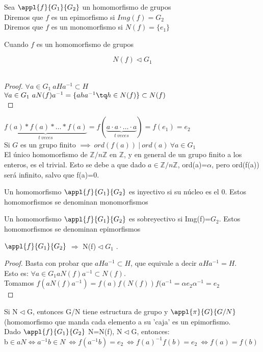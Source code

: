 \documentclass[a4paper,10pt]{apuntes}
\begin{document}
\begin{defn}
Sea $\appl{f}{G_1}{G_2}$ un homomorfismo de grupos\\
Diremos que $f$ es un epimorfismo si $Img(f) = G_2$\\
Diremos que $f$ es un monomorfismo si $N(f) = \{ e_1\} $
\end{defn}

\begin{lemma} Cuando $f$ es un homomorfismo de grupos

$$N(f) \lhd G_1$$\\
\end{lemma}

\begin{proof}
$\forall a\in G_1\ aHa^{-1}\subset H$\\
$\forall a\in G_1\ aN(f)a^{-1} = \{aha^{-1} \tq h\in N(f) \}\subset N(f)$\\
\end{proof}


$\underbrace{f(a) \ast f(a) \ast \hdots \ast f(a)}_{t\ veces} = f(\underbrace{a \cdot a \cdot \hdots \cdot a}_{t\ veces}) = f(e_1) = e_2$\\ 
Si $G$ es un grupo finito $\implies\ ord(f(a))\ |\ ord(a)\ \forall a \in G_1$\\

El único homomorfismo de $\mathds{Z}/n\mathds{Z}$  en $\mathds{Z}$, y en general de un grupo finito a los enteros, es el trivial. Esto se debe
a que dado $a\in\mathds{Z}/n\mathds{Z}$, ord(a)=$\alpha$, pero ord(f(a)) será infinito, salvo que f(a)=0.

\begin{defn}
 Un homomorfismo $\appl{f}{G_1}{G_2}$  es inyectivo si su núcleo es el 0. Estos homomorfismos se denominan monomorfismos
\end{defn}
\begin{defn}
 Un homomorfismo $\appl{f}{G_1}{G_2}$  es sobreyectivo si Img(f)=$G_2$. Estos homomorfismos se denominan epimorfismos
\end{defn}
 
 \begin{lemma}
  $\appl{f}{G_1}{G_2}$  $\Rightarrow$  N(f)$\vartriangleleft G_1$ .
 \end{lemma}
  \begin{proof}
   Basta con probar que $aHa^{-1}\subset H$, que equivale a decir $aHa^{-1}=H$.\\
   Esto es: $\forall a \in G_{1} aN(f)a^{-1}\subset N(f)$.\\
   Tomamos $f(aN(f)a^{-1})=f(a)f(N(f))f(a^{-1}=\alpha e_{2} \alpha^{-1}=e_{2}$\\
  \end{proof}
  
Si N$\vartriangleleft$G, entonces G/N tiene estructura de grupo y $\appl{\pi}{G}{G/N}$  (homomorfismo que manda cada
elemento a su 'caja'  es un epimorfismo.\\

Dado $\appl{f}{G_1}{G_2}$  N=N(f), N$\vartriangleleft$G, entonces:\\
b$\in aN \Leftrightarrow a^{-1}b\in N \ \Leftrightarrow f(a^{-1}b)=e_2 \ \Leftrightarrow f(a)^{-1}f(b)=e_2 \ \Leftrightarrow f(a)=f(b)$
\end{document}
